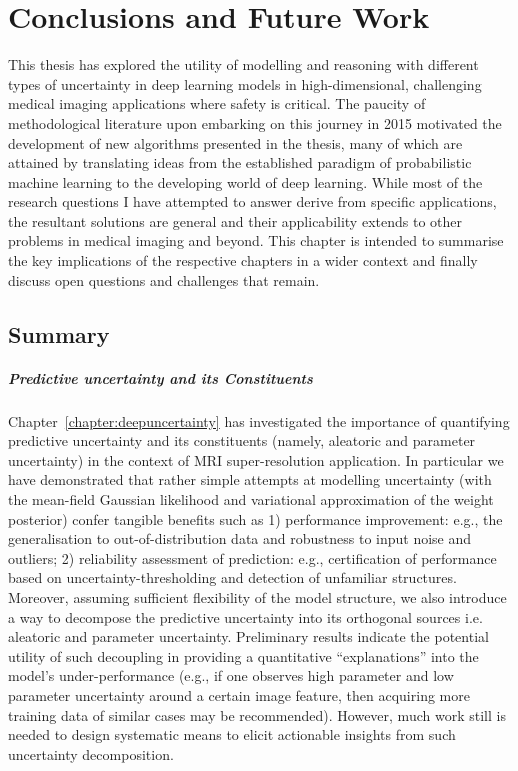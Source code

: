 \chapter{Conclusions and Future Work} \label{chapter:conclusions}

This thesis has explored the utility of modelling and reasoning with different types of uncertainty in deep learning models in high-dimensional, challenging medical imaging applications where safety is critical. The paucity of methodological literature upon embarking on this journey in 2015 motivated the development of new algorithms presented in the thesis, many of which are attained by translating ideas from the established paradigm of probabilistic machine learning to the developing world of deep learning. While most of the research questions I have attempted to answer derive from specific applications, the resultant solutions are general and their applicability extends to other problems in medical imaging and beyond. This chapter is intended to summarise the key implications of the respective chapters in a wider context and finally discuss open questions and challenges that remain.


\section{Summary}
\paragraph{Predictive uncertainty and its Constituents}

Chapter~\ref{chapter:deepuncertainty} has investigated the importance of quantifying predictive uncertainty and its constituents (namely, aleatoric and parameter uncertainty) in the context of MRI super-resolution application. In particular we have demonstrated that rather simple attempts at modelling uncertainty (with the mean-field Gaussian likelihood and variational approximation of the weight posterior) confer tangible benefits such as 1) performance improvement: e.g., the generalisation to out-of-distribution data and robustness to input noise and outliers; 2) reliability assessment of prediction: e.g., certification of performance based on uncertainty-thresholding and detection of unfamiliar structures. Moreover, assuming sufficient flexibility of the model structure, we also introduce a way to decompose the predictive uncertainty into its orthogonal sources i.e. aleatoric and parameter uncertainty. Preliminary results indicate the potential utility of such decoupling in providing a quantitative ``explanations'' into the model's under-performance (e.g., if one observes high parameter and low parameter uncertainty around a certain image feature, then acquiring more training data of similar cases may be recommended). However, much work still is needed to design systematic means to elicit actionable insights from such uncertainty decomposition. 

